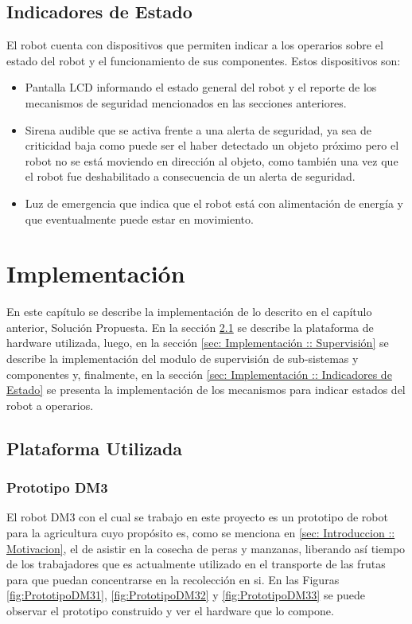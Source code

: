 \documentclass[withindex,glossary]{cam-thesis}
\begin{document}
\section{Indicadores de Estado} \label{sec: sol prop - Indicadores de Estado}
El robot cuenta con dispositivos que permiten indicar a los operarios sobre el estado del robot y el funcionamiento de sus componentes. Estos dispositivos son:
\begin{itemize}
\item Pantalla LCD informando el estado general del robot y el reporte de los mecanismos de seguridad mencionados en las secciones anteriores.
\item Sirena audible que se activa frente a una alerta de seguridad, ya sea de criticidad baja como puede ser el haber detectado un objeto próximo pero el robot no se está moviendo en dirección al objeto, como también una vez que el robot fue deshabilitado a consecuencia de un alerta de seguridad.
\item Luz de emergencia que indica que el robot está con alimentación de energía y que eventualmente puede estar en movimiento.
\end{itemize}

\chapter{Implementación}
En este capítulo se describe la implementación de lo descrito en el capítulo anterior, Solución Propuesta. En la sección \ref{sec: Implementación :: Plataforma Utilizada} se describe la plataforma de hardware utilizada, luego, en la sección \ref{sec: Implementación :: Supervisión} se describe la implementación del modulo de supervisión de sub-sistemas y componentes y, finalmente, en la sección \ref{sec: Implementación :: Indicadores de Estado} se presenta la implementación de los mecanismos para indicar estados del robot a operarios.

\section{Plataforma Utilizada} \label{sec: Implementación :: Plataforma Utilizada}
\subsection{Prototipo DM3}
El robot DM3 con el cual se trabajo en este proyecto es un prototipo de robot para la agricultura cuyo propósito es, como se menciona en \ref{sec: Introduccion :: Motivacion}, el de asistir en la cosecha de peras y manzanas, liberando así tiempo de los trabajadores que es actualmente utilizado en el transporte de las frutas para que puedan concentrarse en la recolección en si. En las Figuras \ref{fig:PrototipoDM31}, \ref{fig:PrototipoDM32} y \ref{fig:PrototipoDM33} se puede observar el prototipo construido y ver el hardware que lo compone.
\end{document}
